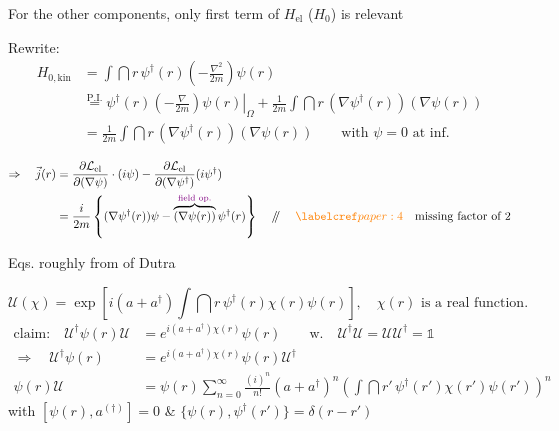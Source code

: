  For the other components, only first term of \(H_{\mathrm{el}}\) (\(H_0\)) is relevant

Rewrite:
\begin{align*}
H_{0,\mathrm{kin}}
  &=\int \dint r\,\psi^\dagger(r)
        \left(-\frac{\nabla^2}{2m}\right)\psi(r)\\
  &\overset{\mathrm{P.I.}}{=}
    \left.\psi^\dagger(r)\left(-\frac{\nabla}{2m}\right)\psi(r)\right|_\Omega
    +\frac{1}{2m}\int \dint r\,(\nabla\psi^\dagger(r))(\nabla\psi(r))\\
  &=\frac{1}{2m}\int \dint r\,(\nabla\psi^\dagger(r))(\nabla\psi(r))
    \qquad \text{with \(\psi=0\) at inf.}
\end{align*}

\begin{align*}
\Rightarrow\quad \vec j(r)
 &=\frac{\partial\mathcal L_{\mathrm{el}}}{\partial(\nabla\psi)}\cdot(i\psi)
   -\frac{\partial\mathcal L_{\mathrm{el}}}{\partial(\nabla\psi^\dagger)}
     (i\psi^\dagger)\\
 &=\frac{i}{2m}\left\{(\nabla\psi^\dagger(r))\psi
       -\overbrace{(\nabla\psi(r))}^{\annotation{\text{field op.}}}
           \psi^\dagger(r)\right\}
   \quad\done\quad \paperref{paper:4}
   \quad \text{missing factor of \(2\)}
\end{align*}

 Eqs.  roughly from
\textcolor{orange}{} of Dutra 


\[
\mathcal U(\chi)=\exp\left[i(a+a^\dagger)
      \int \dint r\,\psi^\dagger(r)\chi(r)\psi(r)\right],
\quad \text{\(\chi(r)\) is a real function}.
\]
\begin{align*}
\text{claim:}\quad
\mathcal U^\dagger\psi(r)\mathcal U
  &=e^{i(a+a^\dagger)\chi(r)}\psi(r)
       \qquad \text{w.}\quad
       \mathcal U^\dagger\mathcal U=\mathcal U\mathcal U^\dagger=\mathbb 1\\
\Rightarrow\quad\mathcal U^\dagger\psi(r)
  &=e^{i(a+a^\dagger)\chi(r)}\psi(r)\mathcal U^\dagger\\
\psi(r)\mathcal U
  &=\psi(r)\sum_{n=0}^{\infty}\frac{(i)^n}{n!}(a+a^\dagger)^n
     \left(\int \dint r'\,\psi^\dagger(r')\chi(r')\psi(r')\right)^n
\end{align*}
with \([\psi(r),a^{(\dagger)}]=0\)
\quad \& \quad \(\{\psi(r),\psi^\dagger(r')\}=\delta(r-r')\)

